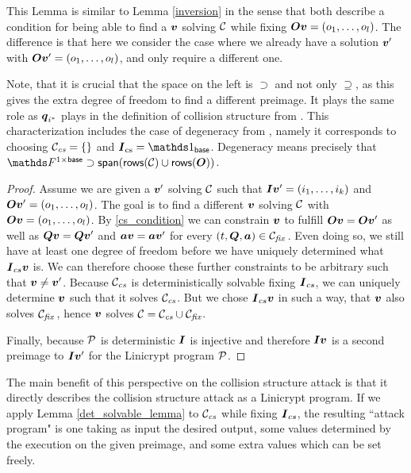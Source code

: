 This Lemma is similar to Lemma \ref{inversion} in the sense that both describe a condition for being able to find a $\vv$ solving $\C$ while fixing $\O\vv = \vec o l$.
The difference is that here we consider the case where we already have a solution $\vv'$ with $\O \vv' = \vec o l$,
and only require a different one. 

Note, that it is crucial that the space on the left is $\supset$ and not only $\supseteq$,
as this gives the extra degree of freedom to find a different preimage.
It plays the same role as $\vq_{i^*}$ plays in the definition of collision structure from \cite{TCC:McQSwoRos19}.
This characterization includes the case of degeneracy from \cite{TCC:McQSwoRos19},
namely it corresponds to choosing $\Ccs = \{\}$ and $\I_\textrm{cs} = \Id_\base$.
Degeneracy means precisely that $\F^{1\times\base} \supset \spn(\rows(\C) \cup \rows(\O))$.

\begin{proof}
Assume we are given a $\vv'$ solving $\C$ such that $\I \vv' = \vec i k$ and $\O \vv' = \vec o l$.
The goal is to find a different $\vv$ solving $\C$ with $\O \vv = \vec o l$.
By \eqref{cs_condition} we can constrain $\vv$ to fulfill $\O \vv = \O \vv'$
as well as $\Q \vv = \Q \vv'$ and $\va\vv = \va\vv'$ for every $(t, \Q, \va) \in \Cfix\,$.
Even doing so, we still have at least one degree of freedom before we have uniquely determined what
$\I_{cs} \vv$ is.
We can therefore choose these further constraints to be arbitrary such that $\vv \neq \vv'$.
Because $\Ccs$ is deterministically solvable fixing $\I_{cs}$,
we can uniquely determine $\vv$ such that it solves $\Ccs$.
But we chose $\I_{cs} \vv$ in such a way, that $\vv$ also solves $\Cfix\,$,
hence $\vv$ solves $\C = \Ccs \cup \Cfix$.

Finally, because $\P$ is deterministic $\I$ is injective and therefore
$\I\vv$ is a second preimage to $\I\vv'$ for the Linicrypt program $\P$.
\end{proof}

The main benefit of this perspective on the collision structure attack is
that it directly describes the collision structure attack as a Linicrypt program.
If we apply Lemma \ref{det_solvable_lemma} to $\Ccs$ while fixing $\I_{cs}$,
the resulting ``attack program" is one taking as input the desired output,
some values determined by the execution on the given preimage,
and some extra values which can be set freely.

